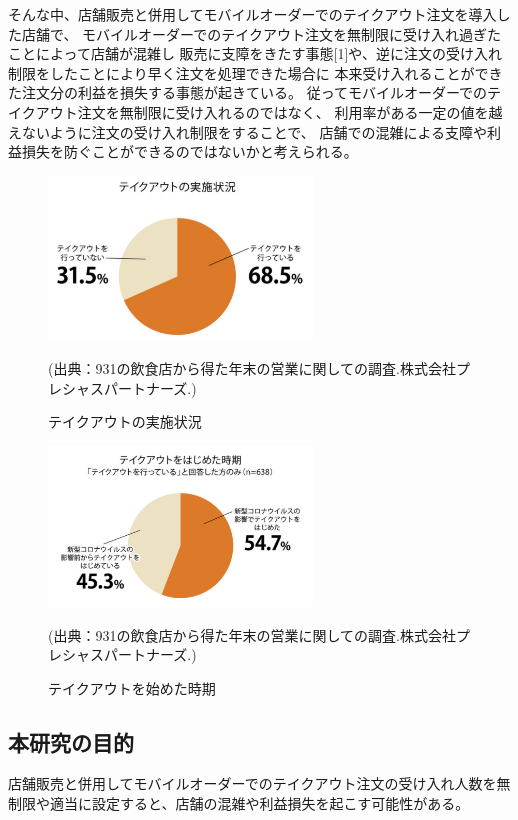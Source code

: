 \documentclass{jsarticle}
\begin{document}
そんな中、店舗販売と併用してモバイルオーダーでのテイクアウト注文を導入した店舗で、
モバイルオーダーでのテイクアウト注文を無制限に受け入れ過ぎたことによって店舗が混雑し
販売に支障をきたす事態[1]や、逆に注文の受け入れ制限をしたことにより早く注文を処理できた場合に
本来受け入れることができた注文分の利益を損失する事態が起きている。
従ってモバイルオーダーでのテイクアウト注文を無制限に受け入れるのではなく、
利用率がある一定の値を越えないように注文の受け入れ制限をすることで、
店舗での混雑による支障や利益損失を防ぐことができるのではないかと考えられる。

\begin{figure}[H]
  \centering
  \includegraphics[width=7cm]{1.png}
  \caption{テイクアウトの実施状況}
  \scriptsize(出典：931の飲食店から得た年末の営業に関しての調査.株式会社プレシャスパートナーズ.)
  \label{fig:1}
\end{figure}

\begin{figure}[H]
  \centering
  \includegraphics[width=7cm]{2.png}
  \caption{テイクアウトを始めた時期}
  \scriptsize(出典：931の飲食店から得た年末の営業に関しての調査.株式会社プレシャスパートナーズ.)
  \label{fig:2}
\end{figure}



\newpage


\subsection{本研究の目的}
店舗販売と併用してモバイルオーダーでのテイクアウト注文の受け入れ人数を無制限や適当に設定すると、店舗の混雑や利益損失を起こす可能性がある。
\end{document}
